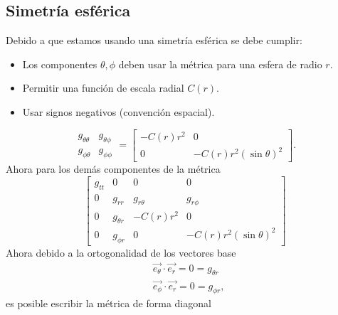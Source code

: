 \subsection{Simetría esférica}
Debido a que estamos usando una simetría esférica se debe cumplir:
\begin{itemize}
    \item Los componentes $\theta, \phi$ deben usar la métrica para una esfera de radio $r$.
    \item Permitir una función de escala radial $C(r)$.
    \item Usar signos negativos (convención espacial).
\end{itemize}

\begin{equation}
    \begin{array}{ll}
        g_{\theta \theta} & g_{\theta \phi} \\
        g_{\phi \theta}   & g_{\phi \phi}
    \end{array} = \left[\begin{array}{cc}
            -C(r) r^2 & 0                        \\
            0         & -C(r) r^2(\sin \theta)^2
        \end{array}\right].
\end{equation}
Ahora para los demás componentes de la métrica
\begin{equation}
    \left[\begin{array}{cccc}
            g_{t t} & 0            & 0            & 0                        \\
            0       & g_{r r}      & g_{r \theta} & g_{r \phi}               \\
            0       & g_{\theta r} & -C(r) r^2    & 0                        \\
            0       & g_{\phi r}   & 0            & -C(r) r^2(\sin \theta)^2
        \end{array}\right]
\end{equation}
Ahora debido a la ortogonalidad de los vectores base
\begin{equation}
    \begin{aligned}
         & \overrightarrow{e_\theta} \cdot \overrightarrow{e_r}=0=g_{\theta r} \\
         & \overrightarrow{e_\phi} \cdot \overrightarrow{e_r}=0=g_{\phi r},
    \end{aligned}
\end{equation}
es posible escribir la métrica de forma diagonal
